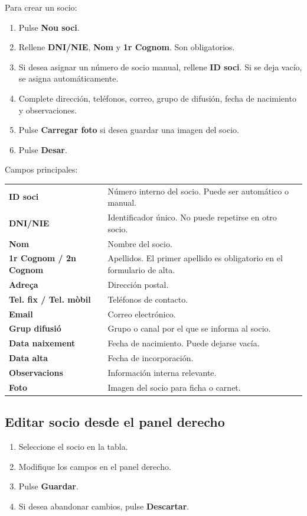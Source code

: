 \documentclass[12pt]{article}
\newcommand{\boton}[1]{\textbf{#1}}
\newcommand{\campo}[1]{\textbf{#1}}
\begin{document}
Para crear un socio:
\begin{enumerate}
  \item Pulse \boton{Nou soci}.
  \item Rellene \campo{DNI/NIE}, \campo{Nom} y \campo{1r Cognom}. Son obligatorios.
  \item Si desea asignar un número de socio manual, rellene \campo{ID soci}. Si se deja vacío, se asigna automáticamente.
  \item Complete dirección, teléfonos, correo, grupo de difusión, fecha de nacimiento y observaciones.
  \item Pulse \boton{Carregar foto} si desea guardar una imagen del socio.
  \item Pulse \boton{Desar}.
\end{enumerate}

Campos principales:
\begin{longtable}{>{\bfseries}p{}p{}}
ID soci & Número interno del socio. Puede ser automático o manual.\\
DNI/NIE & Identificador único. No puede repetirse en otro socio.\\
Nom & Nombre del socio.\\
1r Cognom / 2n Cognom & Apellidos. El primer apellido es obligatorio en el formulario de alta.\\
Adreça & Dirección postal.\\
Tel. fix / Tel. mòbil & Teléfonos de contacto.\\
Email & Correo electrónico.\\
Grup difusió & Grupo o canal por el que se informa al socio.\\
Data naixement & Fecha de nacimiento. Puede dejarse vacía.\\
Data alta & Fecha de incorporación.\\
Observacions & Información interna relevante.\\
Foto & Imagen del socio para ficha o carnet.\\
\end{longtable}

\subsection{Editar socio desde el panel derecho}
\begin{enumerate}
  \item Seleccione el socio en la tabla.
  \item Modifique los campos en el panel derecho.
  \item Pulse \boton{Guardar}.
  \item Si desea abandonar cambios, pulse \boton{Descartar}.
\end{enumerate}
\end{document}
